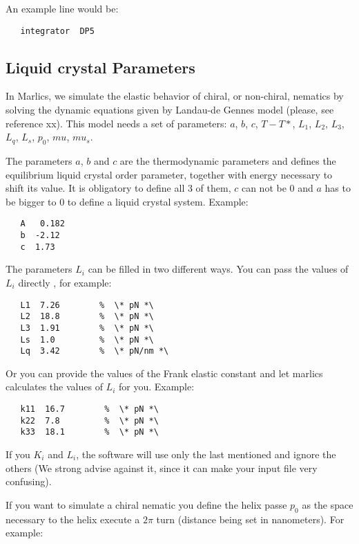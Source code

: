 \documentclass{article}
\begin{document}
 An example line would be:
\begin{lstlisting}
   integrator  DP5
\end{lstlisting}

\subsection{Liquid crystal Parameters}\label{lc.param}

In Marlics, we simulate the elastic behavior of chiral, or non-chiral, nematics by solving the dynamic equations given by Landau-de Gennes 
model (please, see reference xx). This model needs a set of parameters: $a$, $b$, $c$, $T-T*$, $L_1$, $L_2$, $L_3$, $L_q$, $L_s$, $p_0$, $mu$, $mu_s$.

The parameters $a$, $b$ and $c$ are the thermodynamic parameters and defines the equilibrium liquid crystal order parameter, together with energy necessary to shift its value. It is obligatory to define all 3 of them, $c$ can not be 0 and $a$ has to be bigger to 0 to define a liquid crystal system.
Example:
\begin{lstlisting}	
   A   0.182
   b  -2.12
   c  1.73
\end{lstlisting}


The parameters $L_i$ can be filled in two different ways. You can pass the values of $L_i$ directly , for example:
\begin{lstlisting}
   L1  7.26        %  \* pN *\
   L2  18.8        %  \* pN *\
   L3  1.91        %  \* pN *\
   Ls  1.0         %  \* pN *\
   Lq  3.42        %  \* pN/nm *\
\end{lstlisting}


Or you can provide the values of the Frank elastic constant and let marlics calculates the values of $L_i$ for you. Example:
\begin{lstlisting}
   k11  16.7        %  \* pN *\
   k22  7.8         %  \* pN *\
   k33  18.1        %  \* pN *\
\end{lstlisting}
If you  $K_i$ and $L_i$, the software will use only the last mentioned and ignore the others (We strong advise against it, since it can make your input file very confusing).

{If you want to simulate a chiral nematic you define the helix passe $p_0$} as the space necessary to the helix execute a $2 \pi$  turn (distance being set in nanometers). For example:
\end{document}
